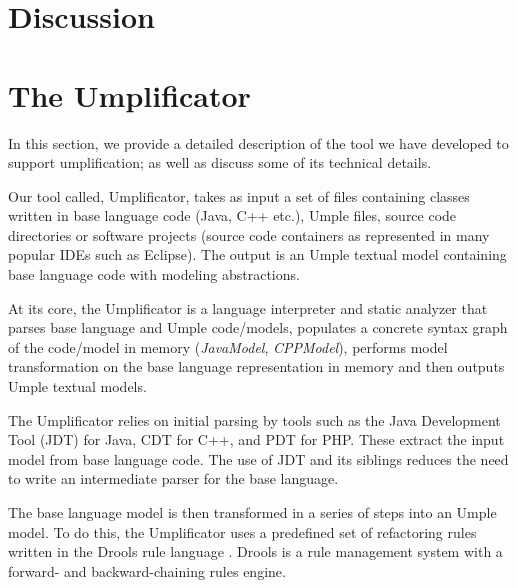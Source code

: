 \section{Discussion}



\section{The Umplificator}
\label{chap:tool}
In this section, we provide a detailed description of the tool we have developed to support umplification; as well as discuss some of its technical details.

Our tool called, Umplificator, takes as input  a set of files containing classes written in base language code (Java, C++ etc.), Umple files, source code directories or software projects (source code containers as represented in many popular IDEs such as Eclipse). The output is an Umple textual model containing base language code with modeling abstractions. 


At its core, the Umplificator is a language interpreter and static analyzer that parses base language and Umple code/models, populates a concrete syntax graph of the code/model in memory (\textit{JavaModel}, \textit{CPPModel}), performs model transformation on the base language representation in memory and then outputs Umple textual models.

The Umplificator relies on initial parsing by tools such as the Java Development Tool (JDT) for Java, CDT for C++, and PDT for PHP. These extract the input model from base language code. The use of JDT and its siblings reduces the need to write an intermediate parser for the base language.

The base language model is then transformed in a series of steps into an Umple model. To do this, the Umplificator uses a predefined set of refactoring rules written in the Drools rule language \cite{Drools_Book}. Drools is a rule management system with a forward- and backward-chaining rules engine. 

